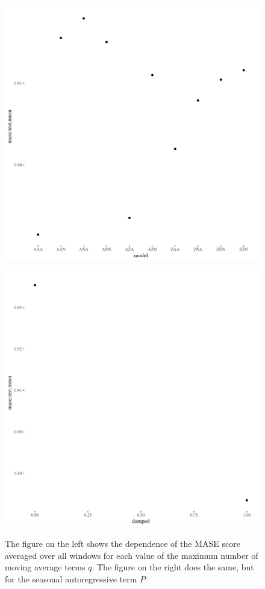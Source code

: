 \documentclass[12pt]{article}\usepackage[]{graphicx}\usepackage[]{color}
\theoremstyle{definition}
\begin{document}
\begin{figure}[h!]
\centering
\begin{minipage}{.5\textwidth}
  \centering
  \includegraphics[width=\linewidth]{ets_dep_plot_max_q.png}
  \label{fig:etsDep1}
\end{minipage}%
\begin{minipage}{.5\textwidth}
  \centering
  \includegraphics[width=\linewidth]{ets_dep_plot_max_p.png}
  \label{fig:etsDep2}
\end{minipage}
\caption{The figure on the left shows the dependence of the MASE score averaged over all windows for each value of the maximum number of moving average terms $q$. The figure on the right does the same, but for the seasonal autoregressive term $P$}
\end{figure}
\end{document}
